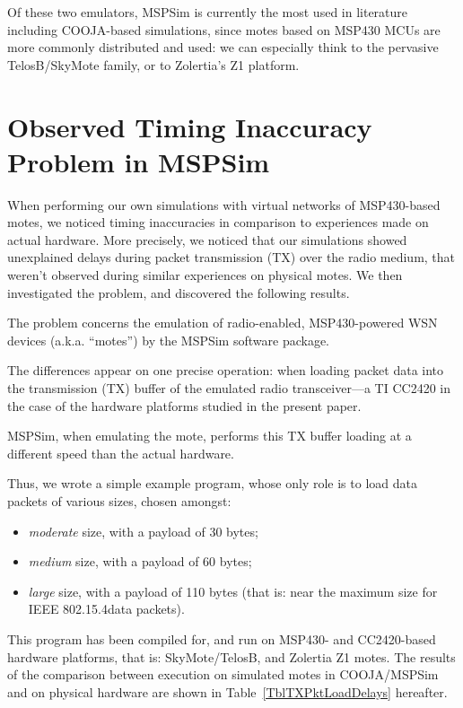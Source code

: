 \documentclass[a4paper,10pt]{article}
\begin{document}
Of these two emulators, MSPSim is currently the most used in literature
including COOJA-based simulations, since motes based on MSP430 MCUs are
more commonly distributed and used: we can especially think to the pervasive
TelosB/SkyMote family, or to Zolertia's Z1 platform.


\section{Observed Timing Inaccuracy Problem in MSPSim}

When performing our own simulations with virtual networks of MSP430-based
motes, we noticed timing inaccuracies in comparison to experiences made
on actual hardware. More precisely, we noticed that our simulations showed
unexplained delays during packet transmission (TX) over the radio medium,
that weren't observed during similar experiences on physical motes.
We then investigated the problem, and discovered the following results.

The problem concerns the emulation of radio-enabled, MSP430-powered WSN
devices (a.k.a. ``motes'') by the MSPSim software package.

The differences appear on one precise operation: when loading packet data
into the transmission (TX) buffer of the emulated radio transceiver---a TI
CC2420 in the case of the hardware platforms studied in the present paper.

MSPSim, when emulating the mote, performs this TX buffer loading at
a different speed than the actual hardware.

Thus, we wrote a simple example program, whose only role is to load data
packets of various sizes, chosen amongst:
\begin{itemize}
\item \emph{moderate} size, with a payload of 30 bytes;
\item \emph{medium} size, with a payload of 60 bytes;
\item \emph{large} size, with a payload of 110 bytes (that is:
      near the maximum size for IEEE 802.15.4\footnotemark[1] data packets).
\end{itemize}
This program has been compiled for, and run on MSP430- and CC2420-based
hardware platforms, that is: SkyMote/TelosB, and Zolertia Z1 motes.
The results of the comparison between execution on simulated motes
in COOJA/MSPSim and on physical hardware are shown in
Table~\ref{TblTXPktLoadDelays} hereafter.
\end{document}
